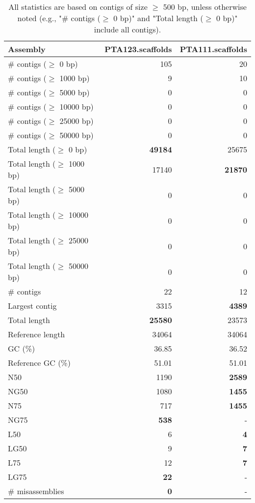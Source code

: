 \documentclass[12pt,a4paper]{article}
\begin{document}
\begin{table}[ht]
\begin{center}
\caption{All statistics are based on contigs of size $\geq$ 500 bp, unless otherwise noted (e.g., "\# contigs ($\geq$ 0 bp)" and "Total length ($\geq$ 0 bp)" include all contigs).}
\begin{tabular}{|l*{2}{|r}|}
\hline
Assembly & PTA123.scaffolds & PTA111.scaffolds \\ \hline
\# contigs ($\geq$ 0 bp) & 105 & 20 \\ \hline
\# contigs ($\geq$ 1000 bp) & 9 & 10 \\ \hline
\# contigs ($\geq$ 5000 bp) & 0 & 0 \\ \hline
\# contigs ($\geq$ 10000 bp) & 0 & 0 \\ \hline
\# contigs ($\geq$ 25000 bp) & 0 & 0 \\ \hline
\# contigs ($\geq$ 50000 bp) & 0 & 0 \\ \hline
Total length ($\geq$ 0 bp) & {\bf 49184} & 25675 \\ \hline
Total length ($\geq$ 1000 bp) & 17140 & {\bf 21870} \\ \hline
Total length ($\geq$ 5000 bp) & 0 & 0 \\ \hline
Total length ($\geq$ 10000 bp) & 0 & 0 \\ \hline
Total length ($\geq$ 25000 bp) & 0 & 0 \\ \hline
Total length ($\geq$ 50000 bp) & 0 & 0 \\ \hline
\# contigs & 22 & 12 \\ \hline
Largest contig & 3315 & {\bf 4389} \\ \hline
Total length & {\bf 25580} & 23573 \\ \hline
Reference length & 34064 & 34064 \\ \hline
GC (\%) & 36.85 & 36.52 \\ \hline
Reference GC (\%) & 51.01 & 51.01 \\ \hline
N50 & 1190 & {\bf 2589} \\ \hline
NG50 & 1080 & {\bf 1455} \\ \hline
N75 & 717 & {\bf 1455} \\ \hline
NG75 & {\bf 538} & - \\ \hline
L50 & 6 & {\bf 4} \\ \hline
LG50 & 9 & {\bf 7} \\ \hline
L75 & 12 & {\bf 7} \\ \hline
LG75 & {\bf 22} & - \\ \hline
\# misassemblies & {\bf 0} & - \\ \hline

\end{tabular}
\end{center}
\end{table}
\end{document}
